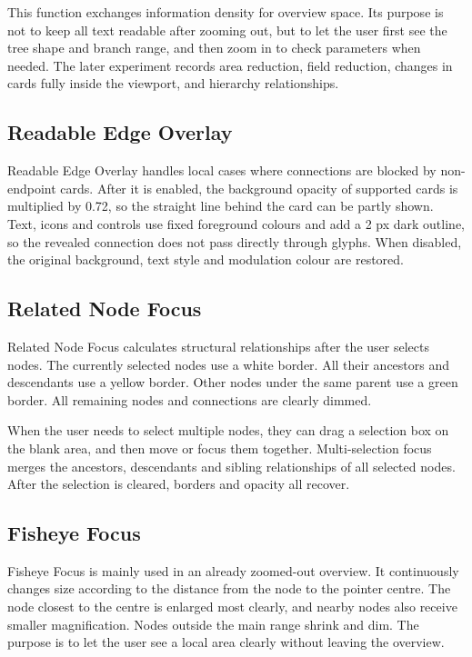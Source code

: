 This function exchanges information density for overview space. Its purpose is not to keep all text readable after zooming out, but to let the user first see the tree shape and branch range, and then zoom in to check parameters when needed. The later experiment records area reduction, field reduction, changes in cards fully inside the viewport, and hierarchy relationships.

\subsection{Readable Edge Overlay}

Readable Edge Overlay handles local cases where connections are blocked by non-endpoint cards. After it is enabled, the background opacity of supported cards is multiplied by 0.72, so the straight line behind the card can be partly shown. Text, icons and controls use fixed foreground colours and add a 2 px dark outline, so the revealed connection does not pass directly through glyphs. When disabled, the original background, text style and modulation colour are restored.

\subsection{Related Node Focus}

Related Node Focus calculates structural relationships after the user selects nodes. The currently selected nodes use a white border. All their ancestors and descendants use a yellow border. Other nodes under the same parent use a green border. All remaining nodes and connections are clearly dimmed.

When the user needs to select multiple nodes, they can drag a selection box on the blank area, and then move or focus them together. Multi-selection focus merges the ancestors, descendants and sibling relationships of all selected nodes. After the selection is cleared, borders and opacity all recover.

\subsection{Fisheye Focus}

Fisheye Focus is mainly used in an already zoomed-out overview. It continuously changes size according to the distance from the node to the pointer centre. The node closest to the centre is enlarged most clearly, and nearby nodes also receive smaller magnification. Nodes outside the main range shrink and dim. The purpose is to let the user see a local area clearly without leaving the overview.

